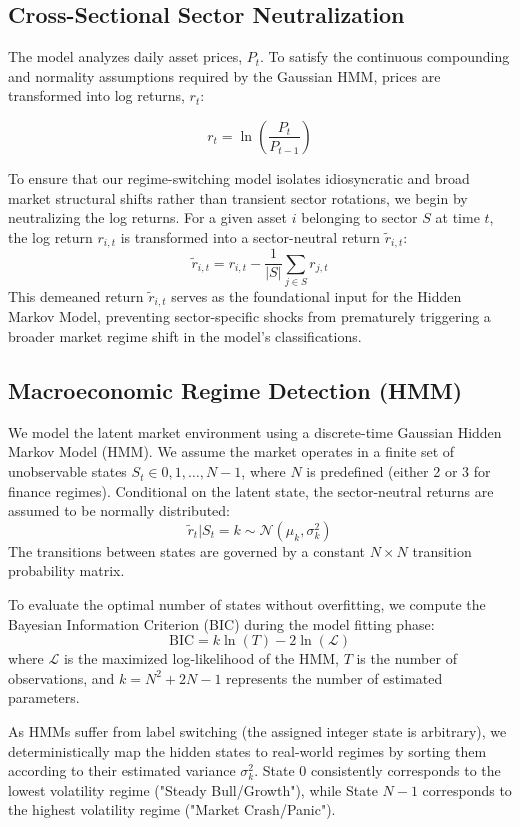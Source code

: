 \documentclass[12pt]{article}
\begin{document}
\subsection{Cross-Sectional Sector Neutralization}

The model analyzes daily asset prices, $P_t$. To satisfy the continuous compounding and normality assumptions required by the Gaussian HMM, prices are transformed into log returns, $r_t$:

\[
r_t = \ln\left(\frac{P_t}{P_{t-1}}\right)
\]

To ensure that our regime-switching model isolates idiosyncratic and broad market structural shifts rather than transient sector rotations, we begin by neutralizing the log returns. For a given asset $i$ belonging to sector $S$ at time $t$, the log return $r_{i,t}$ is transformed into a sector-neutral return $\tilde{r}_{i,t}$: $$ \tilde{r}_{i,t} = r_{i,t} - \frac{1}{|S|} \sum_{j \in S} r_{j,t} $$ This demeaned return $\tilde{r}_{i,t}$ serves as the foundational input for the Hidden Markov Model, preventing sector-specific shocks from prematurely triggering a broader market regime shift in the model's classifications.

\subsection{Macroeconomic Regime Detection (HMM)}
We model the latent market environment using a discrete-time Gaussian Hidden Markov Model (HMM). We assume the market operates in a finite set of unobservable states $S_t \in {0, 1, \dots, N-1}$, where $N$ is predefined (either 2 or 3 for finance regimes). Conditional on the latent state, the sector-neutral returns are assumed to be normally distributed: $$ \tilde{r}_t | S_t = k \sim \mathcal{N}(\mu_k, \sigma_k^2) $$ The transitions between states are governed by a constant $N \times N$ transition probability matrix.

To evaluate the optimal number of states without overfitting, we compute the Bayesian Information Criterion (BIC) during the model fitting phase: $$ \text{BIC} = k \ln(T) - 2 \ln(\mathcal{L}) $$ where $\mathcal{L}$ is the maximized log-likelihood of the HMM, $T$ is the number of observations, and $k = N^2 + 2N - 1$ represents the number of estimated parameters.

As HMMs suffer from label switching (the assigned integer state is arbitrary), we deterministically map the hidden states to real-world regimes by sorting them according to their estimated variance $\sigma_k^2$. State $0$ consistently corresponds to the lowest volatility regime ("Steady Bull/Growth"), while State $N-1$ corresponds to the highest volatility regime ("Market Crash/Panic").
\end{document}
